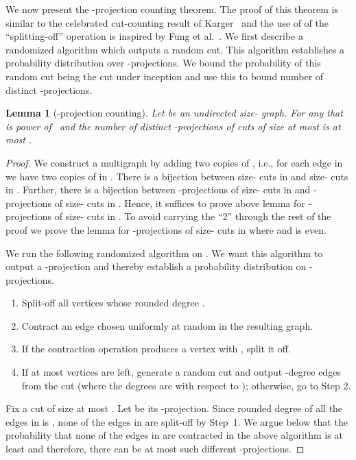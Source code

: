 \documentclass[11pt]{article}
\newtheorem{lemma}[theorem]{Lemma}
\begin{document}
\noindent We now present the -projection counting theorem.
The proof of this theorem is similar to the celebrated cut-counting result of Karger~\cite{karger1993soda} 
and the use of of the ``splitting-off'' operation is inspired by Fung et al.~\cite{fung2011stoc}.
We first describe a randomized algorithm which outputs a random cut.
This algorithm establishes a probability distribution over -projections. 
We bound the probability of this random cut being the cut under inception and use this to bound number of distinct -projections.
\begin{lemma}[-projection counting] \label{lemma:projectionCount}
  Let  be an undirected size- graph. 
  For any  that is power of~ and  the number of distinct -projections of cuts of size at most  is at most .
\end{lemma}
\begin{proof}
  We construct a multigraph  by adding two copies of , i.e., for each edge  in  we have two copies of  in . 
  There is a bijection between size- cuts in  and size- cuts in . 
  Further, there is a bijection between -projections of size- cuts in  and -projections of size- cuts in .
  Hence, it suffices to prove above lemma for -projections of size- cuts in .
  To avoid carrying the ``2'' through the rest of the proof we prove the lemma for -projections of size- cuts in  where  and  is even.

  \noindent We run the following randomized algorithm on .
We want this algorithm to output a -projection and thereby establish a probability distribution on -projections.
  \begin{enumerate}
    \item Split-off all vertices  whose rounded degree .
    \item Contract an edge chosen uniformly at random in the resulting graph.
    \item If the contraction operation produces a vertex  with , split it off. 
    \item If at most  vertices are left, generate a random cut and output -degree edges from the cut (where the degrees are with respect to ); otherwise, go to Step 2.  
  \end{enumerate}
  Fix a cut  of size at most . 
  Let  be its -projection. 
  Since rounded degree of all the edges in  is , none of the edges in  are split-off by Step~1. 
  We argue below that the probability that none of the edges in  are contracted in the above algorithm is at least  and therefore, there can be at most  such different -projections. 


\end{proof}
\end{document}
